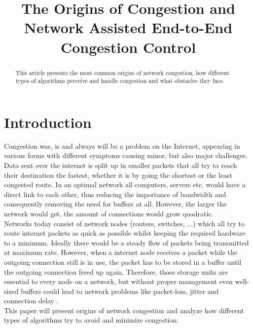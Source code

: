 \documentclass[a4paper,conference]{IEEEtran}
\begin{document}
\title{The Origins of Congestion and\\Network Assisted End-to-End Congestion Control}


\author{
}


\maketitle
\IEEEpeerreviewmaketitle

\begin{abstract}
This article presents the most common origins of network congestion, how different types of algorithms perceive and handle congestion and what obstacles they face.
\end{abstract}

\section{Introduction}
Congestion was, is and always will be a problem on the Internet, appearing in various forms with different symptoms causing minor, but also major challenges. Data sent over the internet is split up in smaller packets that all try to reach their destination the fastest, whether it is by going the shortest or the least congested route. In an optimal network all computers, servers etc. would have a direct link to each other, thus reducing the importance of bandwidth and  consequently removing the need for buffers at all. However, the larger the network would get, the amount of connections would grow quadratic.
\\Networks today consist of network nodes (routers, switches, ...) which all try to route internet packets as quick as possible whilst keeping the required hardware to a minimum. Ideally there would be a steady flow of packets being transmitted at maximum rate. However, when a internet node receives a packet while the outgoing connection still is in use, the packet has to be stored in a buffer until the outgoing connection freed up again. Therefore, those storage units are essential to every node on a network, but without proper management even well-sized buffers could lead to network problems like packet-loss, jitter and connection delay \cite{appenzeller2004sizing}	.
\\This paper will present origins of network congestion and analyze how different types of algorithms try to avoid and minimize congestion.
\end{document}
